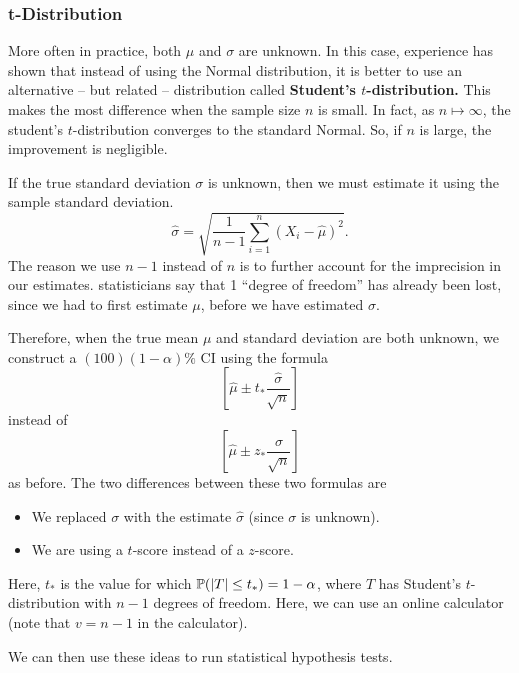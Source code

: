 \subsubsection{t-Distribution}
More often in practice, both $\mu$ and $\sigma$ are unknown. In this case, experience has shown that instead of using the Normal distribution, it is better to use an alternative -- but related -- distribution called \textbf{Student's $t$-distribution.} This makes the most difference when the sample size $n$ is small. In fact, as $n \mapsto \infty$, the student's $t$-distribution converges to the standard Normal. So, if $n$ is large, the improvement is negligible. 

\bigskip 

If the true standard deviation $\sigma$ is unknown, then we must estimate it using the sample standard deviation. 
\[\hat{\sigma} = \sqrt{\frac{1}{n - 1} \sum_{i = 1}^{n} (X_i - \hat{\mu})^2}.\]
The reason we use $n - 1$ instead of $n$ is to further account for the imprecision in our estimates. statisticians say that 1 ``degree of freedom'' has already been lost, since we had to first estimate $\mu$, before we have estimated $\sigma$. 

\bigskip 

Therefore, when the true mean $\mu$ and standard deviation are both unknown, we construct a $(100)(1 - \alpha)\%$ CI using the formula 
\[\left[\hat{\mu} \pm t_* \frac{\hat{\sigma}}{\sqrt{n}} \right]\]
instead of 
\[\left[\hat{\mu} \pm z_* \frac{\sigma}{\sqrt{n}}\right]\]
as before. The two differences between these two formulas are 
\begin{itemize}
    \item We replaced $\sigma$ with the estimate $\hat{\sigma}$ (since $\sigma$ is unknown).
    \item We are using a $t$-score instead of a $z$-score.
\end{itemize}
Here, $t_*$ is the value for which $\mathbb{P}(|T| \leq t_*) = 1 - \alpha$, where $T$ has Student's $t$-distribution with $n - 1$ degrees of freedom. Here, we can use an online calculator (note that $v = n - 1$ in the calculator).

\bigskip 

We can then use these ideas to run statistical hypothesis tests.

